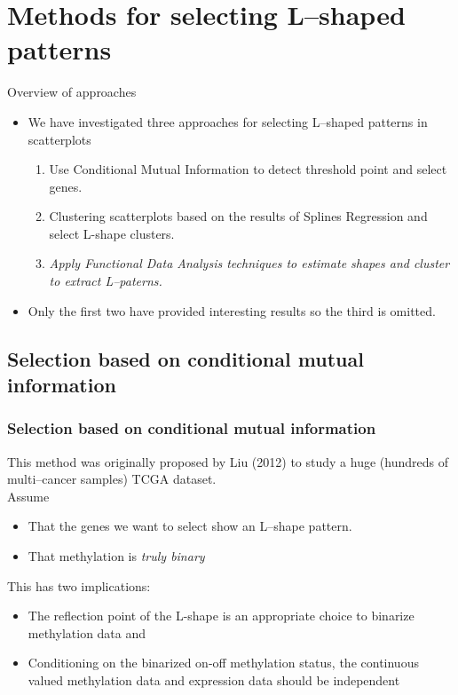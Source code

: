 \documentclass[handout]{beamer}
\begin{document}
\section{Methods for selecting L--shaped patterns}

\begin{frame}{Overview of approaches}
\begin{itemize}
\item We have investigated three approaches for selecting L--shaped patterns in scatterplots
\begin{enumerate}
\item Use Conditional Mutual Information to detect threshold point and select genes.
\item Clustering scatterplots based on the results of Splines Regression and select L-shape clusters.
\item \emph{Apply Functional Data Analysis techniques to estimate shapes and cluster to extract L--paterns.}
\end{enumerate}
\item Only the first two have provided interesting results so the third is omitted.
\end{itemize}
\end{frame}


\subsection{Selection based on conditional mutual information}

\begin{frame}%
\frametitle{Selection based on conditional mutual information}
This method was originally proposed by Liu (2012) to study a huge (hundreds of multi--cancer samples) TCGA dataset.\\
Assume
 \begin{itemize}
  \item That the genes we want to select show an L--shape pattern.
\item That methylation is \emph{truly binary}
\end{itemize}
This has two implications:
\begin{itemize}
\item The reflection point of the L-shape is an appropriate choice to
  binarize methylation data %
and
\item Conditioning on the binarized on-off methylation status, the
  continuous valued methylation data and expression data should be
  independent%
\end{itemize}
\end{frame}
\end{document}
